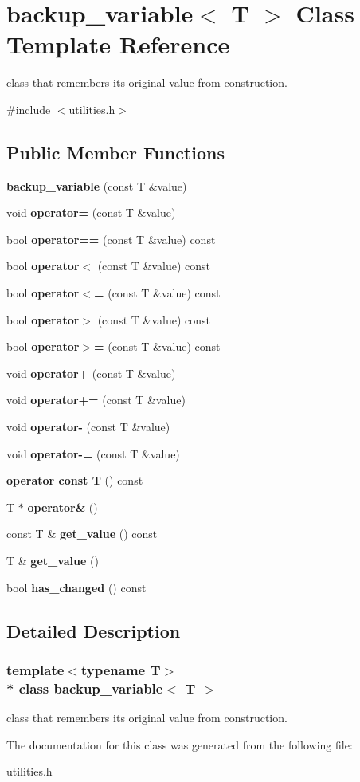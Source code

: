 \section{backup\+\_\+variable$<$ T $>$ Class Template Reference}
\label{classbackup__variable}


class that remembers its original value from construction.  




{\ttfamily \#include $<$utilities.\+h$>$}

\subsection*{Public Member Functions}
\begin{DoxyCompactItemize}
\item 
{\bfseries backup\+\_\+variable} (const T \&value)
\item 
void {\bfseries operator=} (const T \&value)
\item 
bool {\bfseries operator==} (const T \&value) const 
\item 
bool {\bfseries operator$<$} (const T \&value) const 
\item 
bool {\bfseries operator$<$=} (const T \&value) const 
\item 
bool {\bfseries operator$>$} (const T \&value) const 
\item 
bool {\bfseries operator$>$=} (const T \&value) const 
\item 
void {\bfseries operator+} (const T \&value)
\item 
void {\bfseries operator+=} (const T \&value)
\item 
void {\bfseries operator-\/} (const T \&value)
\item 
void {\bfseries operator-\/=} (const T \&value)
\item 
{\bfseries operator const T} () const 
\item 
T $\ast$ {\bfseries operator\&} ()
\item 
const T \& {\bfseries get\+\_\+value} () const 
\item 
T \& {\bfseries get\+\_\+value} ()
\item 
bool {\bfseries has\+\_\+changed} () const 
\end{DoxyCompactItemize}


\subsection{Detailed Description}
\subsubsection*{template$<$typename T$>$\\*
class backup\+\_\+variable$<$ T $>$}

class that remembers its original value from construction. 

The documentation for this class was generated from the following file\+:\begin{DoxyCompactItemize}
\item 
utilities.\+h\end{DoxyCompactItemize}
